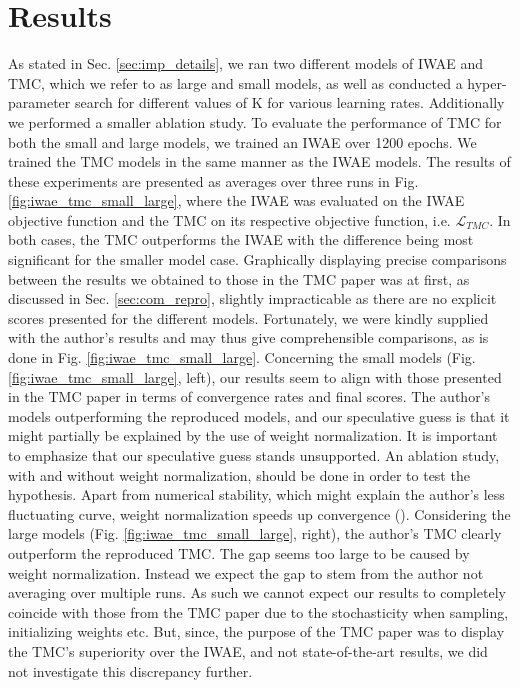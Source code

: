 \documentclass{article}
\begin{document}
\section{Results}
\label{results}
As stated in Sec. \ref{sec:imp_details}, we ran two different models of IWAE and TMC, which we refer to as large and small models, as well as conducted a hyper-parameter search for different values of K for various learning rates. Additionally we performed a smaller ablation study. To evaluate the performance of TMC for both the small and large models, we trained an IWAE over 1200 epochs. We trained the TMC models in the same manner as the IWAE models. The results of these experiments are presented as averages over three runs in Fig. \ref{fig:iwae_tmc_small_large}, where the IWAE was evaluated on the IWAE objective function and the TMC on its respective objective function, i.e. $\mathcal{L}_{TMC}$. In both cases, the TMC outperforms the IWAE with the difference being most significant for the smaller model case. Graphically displaying precise comparisons between the results we obtained to those in the TMC paper was at first, as discussed in Sec. \ref{sec:com_repro}, slightly impracticable as there are no explicit scores presented for the different models. Fortunately, we were kindly supplied with the author's results and may thus give comprehensible comparisons, as is done in Fig. \ref{fig:iwae_tmc_small_large}. Concerning the small models (Fig. \ref{fig:iwae_tmc_small_large}, left), our results seem to align with those presented in the TMC paper in terms of convergence rates and final scores. The author's models outperforming the reproduced models, and our speculative guess is that it might partially be explained by the use of weight normalization. It is important to emphasize that our speculative guess stands unsupported. An ablation study, with and without weight normalization, should be done in order to test the hypothesis. Apart from numerical stability, which might explain the author's less fluctuating curve, weight normalization speeds up convergence (\cite{weightnorm}). Considering the large models (Fig. \ref{fig:iwae_tmc_small_large}, right), the author's TMC clearly outperform the reproduced TMC. The gap seems too large to be caused by weight normalization. Instead we expect the gap to stem from the author not averaging over multiple runs. As such we cannot expect our results to completely coincide with those from the TMC paper due to the stochasticity when sampling, initializing weights etc. But, since, the purpose of the TMC paper was to display the TMC's superiority over the IWAE, and not state-of-the-art results, we did not investigate this discrepancy further. 
\end{document}
